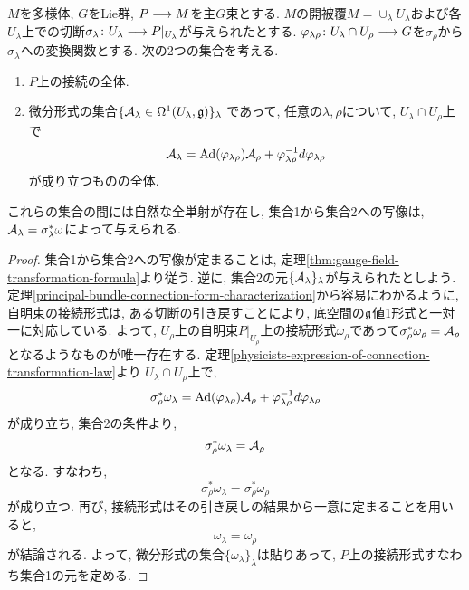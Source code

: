 \begin{thm}
$M$を多様体, $G$をLie群,
$P \longrightarrow M$を主$G$束とする.
$M$の開被覆$M = \cup_\lambda U_\lambda$および各$U_\lambda$上での切断$\sigma_\lambda \colon U_\lambda \longrightarrow P|_{U_\lambda}$が与えられたとする.
$\varphi_{\lambda \rho} \colon U_\lambda \cap U_\rho \longrightarrow G$を$\sigma_\rho$から$\sigma_\lambda$への変換関数とする.
次の2つの集合を考える.
\begin{enumerate}
\item
$P$上の接続の全体.
\item
微分形式の集合$\{ \mathcal{A}_\lambda \in \Omega^1(U_\lambda, \mathfrak{g})\}_\lambda$
であって,
任意の$\lambda, \rho$について, $U_\lambda \cap U_\rho$上で
\begin{equation}
\mathcal{A}_\lambda = \operatorname{Ad}(\varphi_{\lambda \rho})\mathcal{A}_\rho + \varphi_{\lambda \rho}^{-1}d\varphi_{\lambda \rho}
\end{equation}
が成り立つものの全体.
\end{enumerate}
これらの集合の間には自然な全単射が存在し,
集合1から集合2への写像は, $\mathcal{A}_\lambda = \sigma_\lambda^* \omega$によって与えられる.
\end{thm}

\begin{proof}
集合1から集合2への写像が定まることは,
定理\ref{thm:gauge-field-transformation-formula}より従う.
逆に, 集合2の元$\{\mathcal{A}_\lambda\}_\lambda$が与えられたとしよう.
定理\ref{principal-bundle-connection-form-characterization}から容易にわかるように,
自明束の接続形式は, ある切断の引き戻すことにより, 底空間の$\mathfrak{g}$値1形式と一対一に対応している.
よって, $U_\rho$上の自明束$P|_{U_\rho}$上の接続形式$\omega_\rho$であって$\sigma_\rho^* \omega_\rho = \mathcal{A}_\rho$となるようなものが唯一存在する.
定理\ref{physicists-expression-of-connection-transformation-law}より $U_\lambda \cap U_\rho$上で,
\begin{equation}
\sigma_\rho^* \omega_\lambda =
\operatorname{Ad}(\varphi_{\lambda \rho})\mathcal{A}_\rho +
\varphi_{\lambda \rho}^{-1}d\varphi_{\lambda \rho}
\end{equation}
が成り立ち, 集合2の条件より,
\begin{equation}
\sigma_\rho^* \omega_\lambda = \mathcal{A}_\rho
\end{equation}
となる.
すなわち,
\begin{equation}
\sigma_\rho^* \omega_\lambda = \sigma_\rho^* \omega_\rho
\end{equation}
が成り立つ.
再び, 接続形式はその引き戻しの結果から一意に定まることを用いると,
\begin{equation}
\omega_\lambda = \omega_\rho
\end{equation}
が結論される.
よって, 微分形式の集合$\{ \omega_\lambda \}_\lambda$は貼りあって, $P$上の接続形式すなわち集合1の元を定める.
\end{proof}

